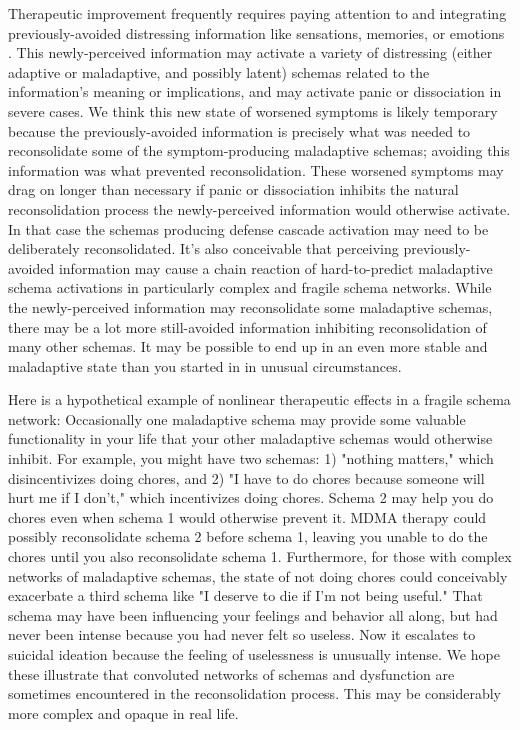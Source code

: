 \documentclass[12pt,letterpaper]{book}
\begin{document}
Therapeutic improvement frequently requires paying attention to and integrating previously-avoided distressing information like sensations, memories, or emotions \cite{berghSelfEvidencing}. This newly-perceived information may activate a variety of distressing (either adaptive or maladaptive, and possibly latent) schemas related to the information's meaning or implications, and may activate panic or dissociation in severe cases. We think this new state of worsened symptoms is likely temporary because the previously-avoided information is precisely what was needed to reconsolidate some of the symptom-producing maladaptive schemas; avoiding this information was what prevented reconsolidation. These worsened symptoms may drag on longer than necessary if panic or dissociation inhibits the natural reconsolidation process the newly-perceived information would otherwise activate. In that case the schemas producing defense cascade activation may need to be deliberately reconsolidated. It's also conceivable that perceiving previously-avoided information may cause a chain reaction of hard-to-predict maladaptive schema activations in particularly complex and fragile schema networks. While the newly-perceived information may reconsolidate some maladaptive schemas, there may be a lot more still-avoided information inhibiting reconsolidation of many other schemas. It may be possible to end up in an even more stable and maladaptive state than you started in in unusual circumstances.

Here is a hypothetical example of nonlinear therapeutic effects in a fragile schema network: Occasionally one maladaptive schema may provide some valuable functionality in your life that your other maladaptive schemas would otherwise inhibit. For example, you might have two schemas: 1) "nothing matters," which disincentivizes doing chores, and 2) "I have to do chores because someone will hurt me if I don't," which incentivizes doing chores. Schema 2 may help you do chores even when schema 1 would otherwise prevent it. MDMA therapy could possibly reconsolidate schema 2 before schema 1, leaving you unable to do the chores until you also reconsolidate schema 1. Furthermore, for those with complex networks of maladaptive schemas, the state of not doing chores could conceivably exacerbate a third schema like "I deserve to die if I'm not being useful." That schema may have been influencing your feelings and behavior all along, but had never been intense because you had never felt so useless. Now it escalates to suicidal ideation because the feeling of uselessness is unusually intense. We hope these illustrate that convoluted networks of schemas and dysfunction are sometimes encountered in the reconsolidation process. This may be considerably more complex and opaque in real life.
\end{document}

